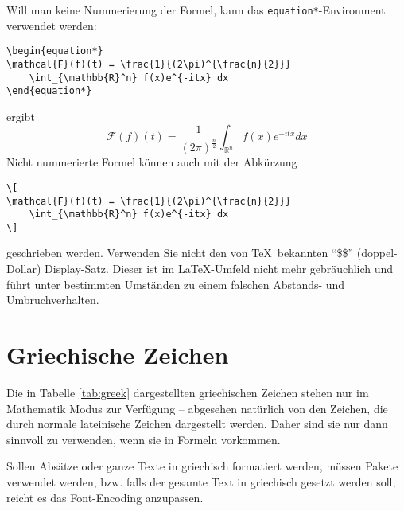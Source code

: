Will man keine Nummerierung der Formel, kann das \texttt{equation*}-En\-vi\-ron\-ment verwendet werden:
\begin{verbatim}
\begin{equation*}
\mathcal{F}(f)(t) = \frac{1}{(2\pi)^{\frac{n}{2}}} 
	\int_{\mathbb{R}^n} f(x)e^{-itx} dx
\end{equation*}
\end{verbatim}
ergibt
\begin{equation*}
\mathcal{F}(f)(t) = \frac{1}{(2\pi)^{\frac{n}{2}}} 
	\int_{\mathbb{R}^n} f(x)e^{-itx} dx
\end{equation*}
Nicht nummerierte Formel können auch mit der Abkürzung
\begin{verbatim}
\[
\mathcal{F}(f)(t) = \frac{1}{(2\pi)^{\frac{n}{2}}} 
	\int_{\mathbb{R}^n} f(x)e^{-itx} dx
\]
\end{verbatim}
geschrieben werden. Verwenden Sie nicht den von \TeX\ bekannten "`\$\$"' (doppel-Dollar) Display-Satz. Dieser ist im \LaTeX-Umfeld nicht mehr gebräuchlich und führt unter bestimmten Umständen zu einem falschen Abstands- und Umbruchverhalten.

\section{Griechische Zeichen}

Die in Tabelle \ref{tab:greek} dargestellten griechischen Zeichen stehen nur im Mathematik Modus zur Verfügung -- abgesehen natürlich von den Zeichen, die durch normale lateinische Zeichen dargestellt werden. Daher sind sie nur dann sinnvoll zu verwenden, wenn sie in Formeln vorkommen. 

Sollen Absätze oder ganze Texte in griechisch formatiert werden, müssen Pakete verwendet werden, bzw. falls der gesamte Text in griechisch gesetzt werden soll, reicht es das Font-Encoding anzupassen.

